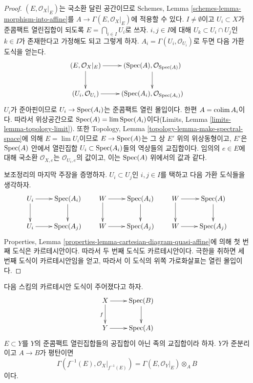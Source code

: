 \begin{proof}
$(E, \mathcal{O}_X|_E)$는 국소환 달린 공간이므로 Schemes, Lemma
\ref{schemes-lemma-morphism-into-affine}를
$A \to \Gamma(E, \mathcal{O}_X|_E)$에 적용할 수 있다.
$I \not = \emptyset$이고 $U_i \subset X$가 준콤팩트 열린집합이 되도록
$E = \bigcap_{i \in I} U_i$로 쓰자. $i, j \in I$에 대해
$U_k \subset U_i \cap U_j$인 $k \in I$가 존재한다고 가정해도 되고 그렇게
하자. $A_i = \Gamma(U_i, \mathcal{O}_{U_i})$로 두면 다음 가환 도식을 얻는다.
$$
\xymatrix{
(E, \mathcal{O}_X|_E) \ar[r] \ar[d] &
(\Spec(A), \mathcal{O}_{\Spec(A)}) \ar[d] \\
(U_i, \mathcal{O}_{U_i}) \ar[r] &
(\Spec(A_i), \mathcal{O}_{\Spec(A_i)})
}
$$
$U_i$가 준아핀이므로 $U_i \to \mathop{\mathrm{Spec}}(A_i)$는 준콤팩트 열린 몰입이다.
한편 $A = \mathop{\mathrm{colim}}\nolimits A_i$이다. 따라서 위상공간으로
$\mathop{\mathrm{Spec}}(A) = \mathop{\mathrm{lim}}\nolimits \mathop{\mathrm{Spec}}(A_i)$이다(Limits, Lemma
\ref{limits-lemma-topology-limit}). 또한 Topology, Lemma
\ref{topology-lemma-make-spectral-space}에 의해 $E = \lim U_i$이므로
$E \to \mathop{\mathrm{Spec}}(A)$는 그 상 $E'$ 위의 위상동형이고, $E'$은 $\mathop{\mathrm{Spec}}(A)$ 안에서
열린집합 $U_i \subset \mathop{\mathrm{Spec}}(A_i)$들의 역상들의 교집합이다. 임의의
$e \in E$에 대해 국소환 $\mathcal{O}_{X, e}$는
$\mathcal{O}_{U_i, e}$의 값이고, 이는 $\mathop{\mathrm{Spec}}(A)$ 위에서의 값과 같다.

\medskip\noindent
보조정리의 마지막 주장을 증명하자. $U_i \subset U_j$인 $i, j \in I$를
택하고 다음 가환 도식들을 생각하자.
$$
\xymatrix{
U_i \ar[r] \ar[d] & \Spec(A_i) \ar[d] \\
U_i \ar[r] & \Spec(A_j)
}
\quad\quad
\xymatrix{
W \ar[r] \ar[d] & \Spec(A_i) \ar[d] \\
W \ar[r] & \Spec(A_j)
}
\quad\quad
\xymatrix{
W \ar[r] \ar[d] & \Spec(A) \ar[d] \\
W \ar[r] & \Spec(A_j)
}
$$
Properties, Lemma \ref{properties-lemma-cartesian-diagram-quasi-affine}에 의해
첫 번째 도식은 카르테시안이다. 따라서 두 번째 도식도 카르테시안이다.
극한을 취하면 세 번째 도식이 카르테시안임을 얻고, 따라서 이 도식의 위쪽
가로화살표는 열린 몰입이다.
\end{proof}

\begin{lemma}
\label{lemma-affine-base-change}
다음 스킴의 카르테시안 도식이 주어졌다고 하자.
$$
\xymatrix{
X \ar[d]_f \ar[r] & \Spec(B) \ar[d] \\
Y \ar[r] & \Spec(A)
}
$$
$E \subset Y$를 $Y$의 준콤팩트 열린집합들의 공집합이 아닌 족의
교집합이라 하자. $Y$가 준분리이고 $A \to B$가 평탄이면
$$
\Gamma(f^{-1}(E), \mathcal{O}_X|_{f^{-1}(E)}) =
\Gamma(E, \mathcal{O}_Y|_E) \otimes_A B
$$
이다.
\end{lemma}

